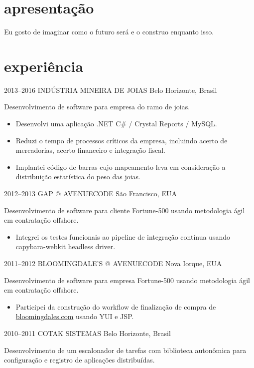 \documentclass[]{friggeri-cv}
\begin{document}
\section{apresentação}
Eu gosto de imaginar como o futuro será e o construo enquanto isso.

\section{experiência}

\begin{entrylist}

\entry
{2013--2016}
{INDÚSTRIA MINEIRA DE JOIAS}
{Belo Horizonte, Brasil}
{ Desenvolvimento de software para empresa do ramo de joias.

  \begin{itemize}
    \item Desenvolvi uma aplicação .NET C\# / Crystal Reports / MySQL.
    \item Reduzi o tempo de processos críticos da empresa, incluindo acerto de mercadorias, acerto financeiro e integração fiscal.
    \item Implantei código de barras cujo mapeamento leva em consideração a distribuição estatística do peso das joias.
  \end{itemize}
  }

\entry
{2012--2013}
{GAP @ AVENUECODE}
{São Francisco, EUA}
{ Desenvolvimento de software para cliente Fortune-500 usando metodologia ágil em contratação offshore.
  \begin{itemize}
    \item Integrei os testes funcionais ao pipeline de integração contínua usando capybara-webkit headless driver.
  \end{itemize}
}


\entry
{2011--2012}
{BLOOMINGDALE'S @ AVENUECODE}
{Nova Iorque, EUA}
{ Desenvolvimento de software para empresa Fortune-500 usando metodologia ágil em contratação offshore.

  \begin{itemize}
    \item Participei da construção do workflow de finalização de compra de \href{http://www.bloomingdales.com}{bloomingdales.com} usando YUI e JSP.
  \end{itemize}
}

\entry
{2010--2011}
{COTAK SISTEMAS}
{Belo Horizonte, Brasil}
{ Desenvolvimento de um escalonador de tarefas com biblioteca autonômica para configuração e registro de aplicações distribuídas.

}
\end{entrylist}
\end{document}
